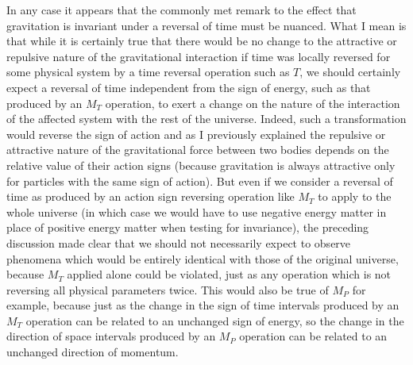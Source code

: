 \documentclass[notitlepage,12pt]{report}
\begin{document}
In any case it appears that the commonly met remark to the effect that gravitation is invariant under a reversal of time must be nuanced. What I mean is that while it is certainly true that there would be no change to the attractive or repulsive nature of the gravitational interaction if time was locally reversed for some physical system by a time reversal operation such as $T$, we should certainly expect a reversal of time independent from the sign of energy, such as that produced by an $M_T$ operation, to exert a change on the nature of the interaction of the affected system with the rest of the universe. Indeed, such a transformation would reverse the sign of action and as I previously explained the repulsive or attractive nature of the gravitational force between two bodies depends on the relative value of their action signs (because gravitation is always attractive only for particles with the same sign of action). But even if we consider a reversal of time as produced by an action sign reversing operation like $M_T$ to apply to the whole universe (in which case we would have to use negative energy matter in place of positive energy matter when testing for invariance), the preceding discussion made clear that we should not necessarily expect to observe phenomena which would be entirely identical with those of the original universe, because $M_T$ applied alone could be violated, just as any operation which is not reversing all physical parameters twice. This would also be true of $M_P$ for example, because just as the change in the sign of time intervals produced by an $M_T$ operation can be related to an unchanged sign of energy, so the change in the direction of space intervals produced by an $M_P$ operation can be related to an unchanged direction of momentum.
\end{document}
